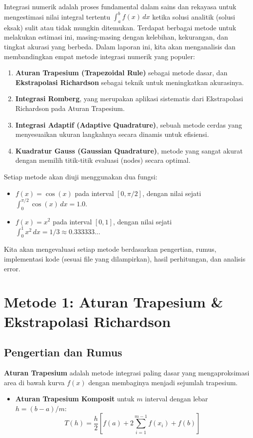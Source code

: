 \documentclass[a4paper, 11pt]{article} %
\begin{document}
Integrasi numerik adalah proses fundamental dalam sains dan rekayasa untuk mengestimasi nilai integral tertentu $\int_a^b f(x) \, dx$ ketika solusi analitik (solusi eksak) sulit atau tidak mungkin ditemukan. %
Terdapat berbagai metode untuk melakukan estimasi ini, masing-masing dengan kelebihan, kekurangan, dan tingkat akurasi yang berbeda. %
Dalam laporan ini, kita akan menganalisis dan membandingkan empat metode integrasi numerik yang populer: %
\begin{enumerate}
    \item \textbf{Aturan Trapesium (Trapezoidal Rule)} sebagai metode dasar, dan \textbf{Ekstrapolasi Richardson} sebagai teknik untuk meningkatkan akurasinya. %
    \item \textbf{Integrasi Romberg}, yang merupakan aplikasi sistematis dari Ekstrapolasi Richardson pada Aturan Trapesium. %
    \item \textbf{Integrasi Adaptif (Adaptive Quadrature)}, sebuah metode cerdas yang menyesuaikan ukuran langkahnya secara dinamis untuk efisiensi. %
    \item \textbf{Kuadratur Gauss (Gaussian Quadrature)}, metode yang sangat akurat dengan memilih titik-titik evaluasi (nodes) secara optimal. %
\end{enumerate}
Setiap metode akan diuji menggunakan dua fungsi: %
\begin{itemize}
    \item $f(x) = \cos(x)$ pada interval $[0, \pi/2]$, dengan nilai sejati $\int_0^{\pi/2} \cos(x) \, dx = 1.0$. %
    \item $f(x) = x^2$ pada interval $[0, 1]$, dengan nilai sejati $\int_0^1 x^2 \, dx = 1/3 \approx 0.333333...$ %
\end{itemize}
Kita akan mengevaluasi setiap metode berdasarkan pengertian, rumus, implementasi kode (sesuai file yang dilampirkan), hasil perhitungan, dan analisis error. %
\newpage %
\section{Metode 1: Aturan Trapesium \& Ekstrapolasi Richardson} %

\subsection{Pengertian dan Rumus} %
\textbf{Aturan Trapesium} adalah metode integrasi paling dasar yang mengaproksimasi area di bawah kurva $f(x)$ dengan membaginya menjadi sejumlah trapesium. %
\begin{itemize}
    \item \textbf{Aturan Trapesium Komposit} untuk $m$ interval dengan lebar $h = (b-a)/m$: %
    \[ T(h) = \frac{h}{2} \left[ f(a) + 2\sum_{i=1}^{m-1} f(x_i) + f(b) \right] \] %
\end{itemize}
\end{document}
